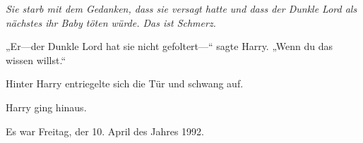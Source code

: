 \emph{Sie starb mit dem Gedanken, dass sie versagt hatte und dass der Dunkle Lord als nächstes ihr Baby töten würde. Das ist Schmerz.}

„Er—der Dunkle Lord hat sie nicht gefoltert—“ sagte Harry. „Wenn du das wissen willst.“

Hinter Harry entriegelte sich die Tür und schwang auf.

Harry ging hinaus.

Es war Freitag, der 10. April des Jahres 1992.

